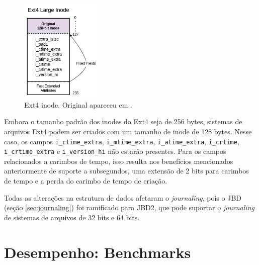 \documentclass[
	12pt,				%
	openright,			%
	oneside,			%
	a4paper,			%
	chapter=TITLE,		%
	english,			%
	french,				%
	spanish,			%
	brazil				%
	]{abntex2}
\theoremstyle{definition}
\begin{document}
\begin{figure}[H]
  \centering%
  \includegraphics[width=0.34\textwidth]{fig12.png}
  \caption{Ext4 inode. Original apareceu em \cite{matur}.}
  \label{fig:ext4-inode}
\end{figure}

Embora o tamanho padrão dos inodes do Ext4 seja de 256 bytes, sistemas de 
arquivos Ext4 podem ser criados com um tamanho de inode de 128 bytes. Nesse caso, os campos 
\texttt{i\_ctime\_extra}, \texttt{i\_mtime\_extra}, \texttt{i\_atime\_extra}, \texttt{i\_crtime}, 
\texttt{i\_crtime\_extra} e \texttt{i\_version\_hi} não estarão presentes. Para os campos 
relacionados a carimbos de tempo, isso resulta nos benefícios mencionados anteriormente de 
suporte a subsegundos, uma extensão de 2 bits para carimbos de tempo e a perda do carimbo de tempo de criação.

Todas as alterações na estrutura de dados afetaram o \textit{journaling}, pois o JBD (seção \ref{sec:journaling})
foi ramificado para JBD2, que pode suportar o \textit{journaling} de sistemas de arquivos de 32 bits e 64 bits.

\chapter{Desempenho: Benchmarks}


\end{document}
